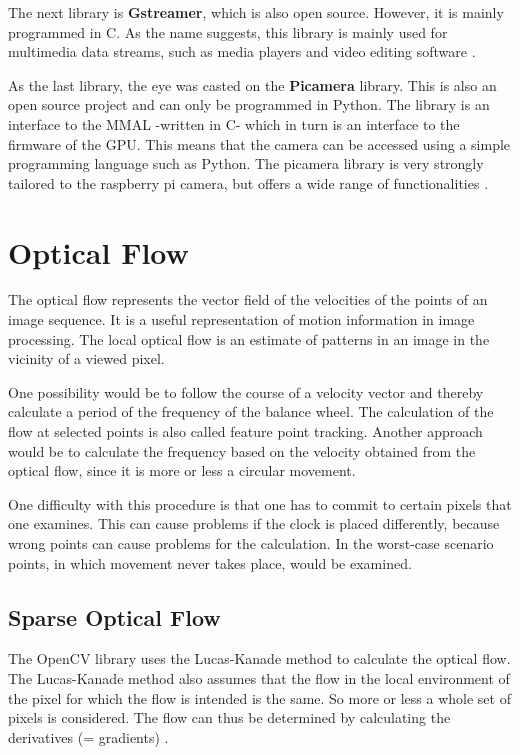 \documentclass[12pt, a4paper]{report}
\begin{document}
The next library is \textbf{Gstreamer}, which is also open source. However, it is mainly programmed in C. As the name suggests, this library is mainly used for multimedia data streams, such as media players and video editing software \cite{gstreamer}.

\bigskip
As the last library, the eye was casted on the \textbf{Picamera} library. This is also an open source project and can only be programmed in Python. The library is an interface to the MMAL -written in C- which in turn is an interface to the firmware of the GPU. This means that the camera can be accessed using a simple programming language such as Python. The picamera library is very strongly tailored to the raspberry pi camera, but offers a wide range of functionalities \cite{ReadTheDocsPicamera}.
    
    \section{Optical Flow}
    The optical flow represents the vector field of the velocities of the points of an image sequence. It is a useful representation of motion information in image processing. The local optical flow is an estimate of patterns in an image in the vicinity of a viewed pixel. 
    
    One possibility would be to follow the course of a velocity vector and thereby calculate a period of the frequency of the balance wheel. The calculation of the flow at selected points is also called feature point tracking. Another approach would be to calculate the frequency based on the velocity obtained from the optical flow, since it is more or less a circular movement. 
    
    One difficulty with this procedure is that one has to commit to certain pixels that one examines. This can cause problems if the clock is placed differently, because wrong points can cause problems for the calculation. In the worst-case scenario points, in which movement never takes place, would be examined.
    
    \subsection{Sparse Optical Flow}
    
    The OpenCV library uses the Lucas-Kanade method to calculate the optical flow. The Lucas-Kanade method also assumes that the flow in the local environment of the pixel for which the flow is intended is the same. So more or less a whole set of pixels is considered. The flow can thus be determined by calculating the derivatives (= gradients) \cite{opencv}.
    
\end{document}
